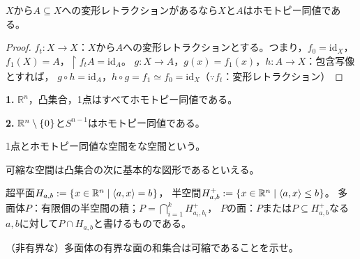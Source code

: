 \documentclass[uplatex]{jsarticle}
\begin{document}
\begin{hodai}
  $X$から$A \subseteq X$への変形レトラクションがあるなら$X$と$A$はホモトピー同値である。
\end{hodai}

\begin{proof}
  $f_{t} \colon X \longrightarrow X$：$X$から$A$への変形レトラクションとする。つまり，$f_{0} = \mathrm{id}_{X}$，$f_{1}(X) = A$，$\restriction{f_{t}}{A} = \mathrm{id}_{A}$。
  $g \colon X \longrightarrow A$，$g(x) = f_{1} (x)$，$h \colon A \longrightarrow X$：包含写像とすれば，
  $g \circ h = \mathrm{id}_{A}$，$h \circ g = f_{1} \simeq f_{0} = \mathrm{id}_{X}$（$\because f_{t}$：変形レトラクション）
\end{proof}

\begin{corr}
  {\bf 1.} $\mathbb{R}^{n}$，凸集合，1点はすべてホモトピー同値である。

  {\bf 2.} $\mathbb{R}^{n} \setminus \Set{\hspace{-1.8pt} 0 \hspace{-1.8pt}}$と$S^{n-1}$はホモトピー同値である。
\end{corr}

\begin{teigi}
  1点とホモトピー同値な空間をな空間という。
\end{teigi}

 可縮な空間は凸集合の次に基本的な図形であるといえる。

\sukima {} 超平面$H_{a,b} := \Set{\hspace{-1.8pt} x \in \mathbb{R}^{n} | \left\langle a, x \right\rangle = b \hspace{-1.8pt}}$，
半空間$H_{a,b}^{+} := \Set{\hspace{-1.8pt} x \in \mathbb{R}^{n} | \left\langle a, x \right\rangle \le b \hspace{-1.8pt}}$。
多面体$P$：有限個の半空間の積；${\displaystyle P = \bigcap_{i=1}^{k} H_{a_{i}, b_{i}}^{+}}$，
$P$の面：$P$または$P \subseteq H_{a,b}^{+}$なる$a,b$に対して$P \cap H_{a,b}$と書けるものである。

（非有界な）多面体の有界な面の和集合は可縮であることを示せ。
\end{document}
